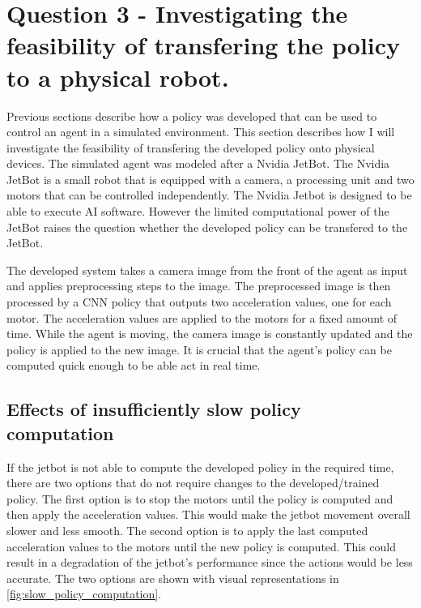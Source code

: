 \section{Question 3 - Investigating the feasibility of transfering the policy to a physical robot.}

Previous sections describe how a policy was developed that can be used to control an agent in a simulated environment. This section describes how I will investigate the feasibility of transfering the developed policy onto physical devices. The simulated agent was modeled after a Nvidia JetBot. The Nvidia JetBot is a small robot that is equipped with a camera, a processing unit and two motors that can be controlled independently.
The Nvidia Jetbot is designed to be able to execute AI software. However the limited computational power of the JetBot raises the question whether the developed policy can be transfered to the JetBot.

The developed system takes a camera image from the front of the agent as input and applies preprocessing steps to the image. The preprocessed image is then processed by a \ac{CNN} policy that outputs two acceleration values, one for each motor. The acceleration values are applied to the motors for a fixed amount of time. While the agent is moving, the camera image is constantly updated and the policy is applied to the new image. It is crucial that the agent's policy can be computed quick enough to be able act in real time.

\subsection*{Effects of insufficiently slow policy computation}
If the jetbot is not able to compute the developed policy in the required time, there are two options that do not require changes to the developed/trained policy. The first option is to stop the motors until the policy is computed and then apply the acceleration values. This would make the jetbot movement overall slower and less smooth.
The second option is to apply the last computed acceleration values to the motors until the new policy is computed. This could result in a degradation of the jetbot's performance since the actions would be less accurate.
The two options are shown with visual representations in \ref{fig:slow_policy_computation}.




\newcommand{\spc}[2]{\subfigure[#1]{\texttt{[image: Bilder/slow\_policy\_computation/\#2.png]}}}

